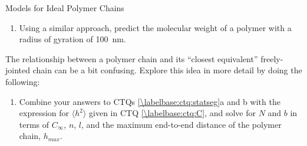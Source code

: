 \begin{activity}{Models for Ideal Polymer Chains}
\begin{exercises}
\begin{enumerate}
			\item Using a similar approach, predict the molecular weight of a polymer with a radius of gyration of 100~nm.
	
		\begin{solution}\end{solution}
		\end{enumerate}
		
	\exercise \label{\labelbase:exc:statseg} The relationship between a polymer chain and its ``closest equivalent'' freely-jointed chain can be a bit confusing.  Explore this idea in more detail by doing the following:
	
		\begin{enumerate}
			\item Combine your answers to CTQs \ref{\labelbase:ctq:statseg}a and b with the expression for $\langle h^2\rangle$ given in CTQ \ref{\labelbase:ctq:C}, and solve for $N$ and $b$ in terms of $C_\infty$, $n$, $l$, and the maximum end-to-end distance of the polymer chain, $h_{max}$.
				
				\begin{solution}\end{solution}
			

\end{enumerate}
\end{exercises}
\end{activity}
